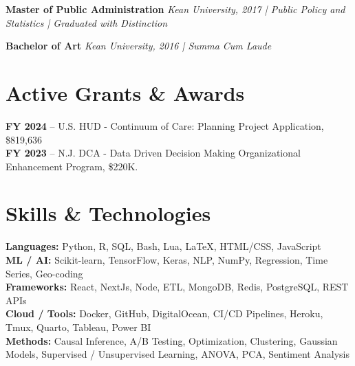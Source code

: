 \documentclass[11pt,a4paper]{article}
\begin{document}
\vspace{0.3em}

\par\noindent\textbf{Master of Public Administration}  
\newline\textit{Kean University, 2017 | Public Policy and Statistics | Graduated with
Distinction}  

\vspace{0.3em}

\par\noindent\textbf{Bachelor of Art}  
\newline\textit{Kean University, 2016 | Summa Cum Laude}  

\section*{Active Grants \& Awards}
\textbf{FY 2024} – U.S. HUD - Continuum of Care: Planning Project Application, \$819,636\\
\textbf{FY 2023} – N.J. DCA - Data Driven Decision Making Organizational Enhancement Program, \$220K. \\

\section*{Skills \& Technologies}

\textbf{Languages:} Python, R, SQL, Bash, Lua, LaTeX, HTML/CSS, JavaScript \\
\textbf{ML / AI:} Scikit-learn, TensorFlow, Keras, NLP, NumPy, Regression, Time Series, Geo-coding \\
\textbf{Frameworks:} React, NextJs, Node, ETL, MongoDB, Redis, PostgreSQL, REST
APIs \\
\textbf{Cloud / Tools:} Docker, GitHub, DigitalOcean, CI/CD Pipelines, Heroku, Tmux,
Quarto, Tableau, Power BI \\
\textbf{Methods:} Causal Inference, A/B Testing, Optimization, Clustering, Gaussian
Models, Supervised / Unsupervised Learning, ANOVA, PCA, Sentiment Analysis
\end{document}
